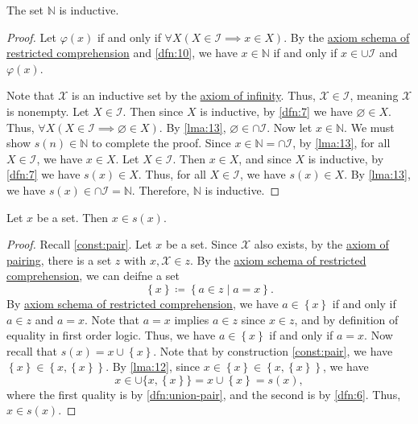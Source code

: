 \documentclass{article}
\begin{document}
\begin{lemma}\label{lma:14}
	The set $\mathbb{N} $ is inductive.
\end{lemma}
\begin{proof}
	Let $\varphi (x)$ if and only if $\forall X(X\in \mathcal{I} \implies x\in X)$. By the \hyperref[axiom:comprehension]{axiom schema of restricted comprehension} and \cref{dfn:10}, we have $x\in\mathbb{N} $ if and only if $x\in \cup \mathcal{I} $ and $\varphi (x)$.

	Note that $\mathcal{X} $ is an inductive set by the \hyperref[axiom:infinity]{axiom of infinity}. Thus, $\mathcal{X} \in \mathcal{I} $, meaning $\mathcal{X} $ is nonempty. Let $X\in \mathcal{I} $. Then since $X$ is inductive, by \cref{dfn:7} we have $\varnothing \in X$. Thus, $\forall X(X\in \mathcal{I} \implies \varnothing \in X)$. By \cref{lma:13}, $\varnothing \in \cap \mathcal{I} $. Now let $x\in\mathbb{N} $. We must show $s(n)\in \mathbb{N} $ to complete the proof. Since $x\in\mathbb{N} =\cap \mathcal{I} $, by \cref{lma:13}, for all $X\in \mathcal{I} $, we have $x\in X$. Let $X\in \mathcal{I} $. Then $x\in X$, and since $X$ is inductive, by \cref{dfn:7} we have $s(x)\in X$. Thus, for all $X\in \mathcal{I} $, we have $s(x)\in X$. By \cref{lma:13}, we have $s(x)\in \cap \mathcal{I} =\mathbb{N} $. Therefore, $\mathbb{N} $ is inductive.
\end{proof}

\begin{lemma}\label{lma:15}
	Let $x$ be a set. Then $x\in s(x)$.
\end{lemma}
\begin{proof}
	Recall \cref{const:pair}. Let $x$ be a set. Since $\mathcal{X} $ also exists, by the \hyperref[axiom:pairing]{axiom of pairing}, there is a set $z$ with $x,\mathcal{X} \in z$. By the \hyperref[axiom:comprehension]{axiom schema of restricted comprehension}, we can deifne a set
	\[
		\left\{ x \right\} \coloneqq \left\{ a\in z \mid a=x \right\} 
	.\]
	By \hyperref[axiom:comprehension]{axiom schema of restricted comprehension}, we have $a\in \left\{ x \right\} $ if and only if $a\in z$ and $a=x$. Note that $a=x$ implies $a\in z$ since $x\in z$, and by definition of equality in first order logic. Thus, we have $a\in \left\{ x \right\} $ if and only if $a=x$. Now recall that $s(x) = x \cup \left\{ x \right\} $. Note that by construction \ref{const:pair}, we have $\left\{ x \right\} \in \left\{ x,\left\{ x \right\}  \right\} $. By \cref{lma:12}, since $x\in \left\{ x \right\} \in \left\{ x,\left\{ x \right\}  \right\} $, we have
	\[
		x\in \cup \{ x,\left\{ x \right\}  \} = x \cup \left\{ x \right\} =s(x),
	\]
	where the first quality is by \cref{dfn:union-pair}, and the second is by \cref{dfn:6}. Thus, $x\in s(x)$.
\end{proof}
\end{document}
